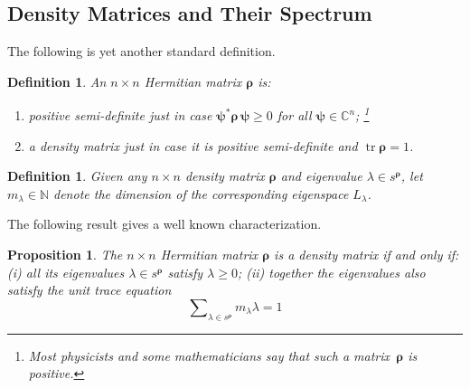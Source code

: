 \documentclass[11pt]{article}
\newcommand \N { \mathbb{N} }
\newcommand \C { \mathbb{C} }
\DeclareMathOperator{\tr}{tr}
\newtheorem{proposition}[theorem]{Proposition}
\newtheorem{definition}[theorem]{Definition}
\begin{document}
\subsection{Density Matrices and Their Spectrum} \label{ss:densityMatrices}

The following is yet another standard definition.

\begin{definition}
	An $n \times n$ Hermitian matrix $ \boldsymbol \rho $ is:
	\begin{enumerate}
		\item \emph{positive semi-definite} just in case 
		\( \boldsymbol \psi ^* \boldsymbol \rho \, \boldsymbol \psi \ge 0 \)
		for all $ \boldsymbol \psi \in \C^n $;%
		\footnote{Most physicists and some mathematicians say 
		that such a matrix~$ \boldsymbol \rho $ is \emph{positive}.}
		\item a \emph{density matrix} just in case it is positive semi-definite 
		and $ \tr \boldsymbol \rho = 1$.
	\end{enumerate}
\end{definition}

\begin{definition}
	Given any $n \times n$ density matrix $ \boldsymbol \rho $ 
	and eigenvalue $ \lambda \in s^{ \boldsymbol \rho }$, 
	let $ m_\lambda \in \N$ denote the dimension of the corresponding eigenspace $ L_\lambda $.
\end{definition}

The following result gives a well known characterization.

\begin{proposition} \label{prop:densityMatrix}
	The $n \times n$ Hermitian matrix $ \boldsymbol \rho $ is a density matrix if and only if:	
	(i) all its eigenvalues $ \lambda \in s^{ \boldsymbol \rho }$ satisfy $ \lambda \ge 0$; 
	(ii) together the eigenvalues also satisfy the unit trace equation
\begin{equation} \label{eq:traceOne}
	\sum\nolimits _{ \lambda \in s^{ \boldsymbol \rho }}  m_\lambda \lambda = 1
\end{equation}
\end{proposition}
\end{document}
